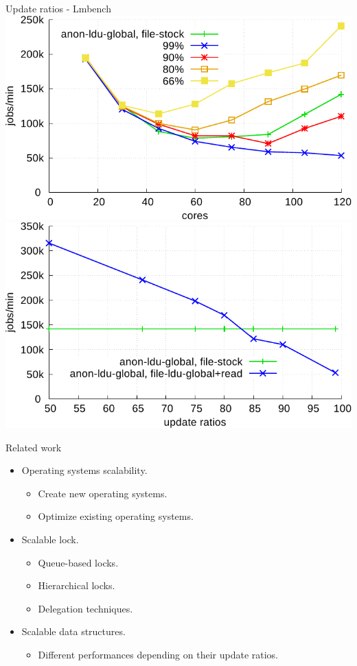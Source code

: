 \documentclass[english]{beamer} %
\begin{document}
\begin{frame}{Update ratios - Lmbench}
\includegraphics[scale=0.4]{graph/ratio_lmbench_core}
\includegraphics[scale=0.4]{graph/ratio_lmbench}
\end{frame}


\begin{frame}{Related work}
\begin{itemize}
    \item Operating systems scalability.
    \begin{itemize}
    \item Create new operating systems.
    \item Optimize existing operating systems.
    \end{itemize}    
    \item Scalable lock.
    \begin{itemize}
    \item Queue-based locks.
    \item Hierarchical locks.
    \item Delegation techniques.
    \end{itemize}
    \item Scalable data structures.
    \begin{itemize}
    \item Different performances depending on their update ratios.
    \end{itemize}
    \end{itemize}
\end{frame}
\end{document}
